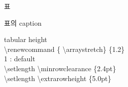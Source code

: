 \documentclass[ aspectratio=149,  14pt,blue,xcolor=pdftex,dvipsnames,table,handout,notes]{beamer}
\begin{document}


		\begin{frame}[plain]
		\centering
		\scalebox{10}{표}

		
		\end{frame}

		\begin{frame}[t]{표}

		\begin{block}{표의 caption}
		\end{block}



		tabular height\\
		\textbackslash renewcommand \{ \textbackslash arraystretch\} \{1.2\} \\
		1 : default\\
		\textbackslash setlength \textbackslash minrowclearance \{2.4pt\} \\
		\textbackslash setlength \textbackslash extrarowheight \{5.0pt\} 

		\end{frame}
\end{document}
